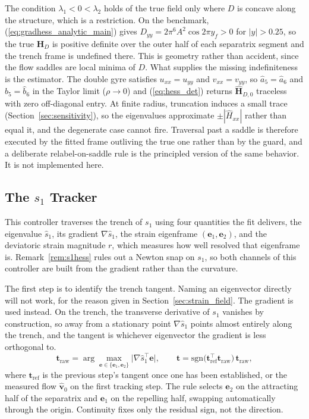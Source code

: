 \documentclass[lettersize,journal]{IEEEtran}
\begin{document}
The condition $\lambda_1 < 0 < \lambda_2$ holds of the true field only
where $D$ is concave along the structure, which is a restriction. On the
benchmark, (\ref{eq:gradhess_analytic_main}) gives $D_{yy} = 2\pi^6
A^2\cos 2\pi y_f > 0$ for $|y| > 0.25$, so the true $\mathbf{H}_D$ is
positive definite over the outer half of each separatrix segment and the
trench frame is undefined there. This is geometry rather than accident,
since the flow saddles are local minima of $D$. What supplies the
missing indefiniteness is the estimator. The double gyre satisfies
$u_{xx} = u_{yy}$ and $v_{xx} = v_{yy}$, so $\hat{a}_5 = \hat{a}_6$ and
$\hat{b}_5 = \hat{b}_6$ in the Taylor limit ($\rho \to 0$) and
(\ref{eq:hess_det}) returns $\hat{\mathbf{H}}_{D,0}$ traceless with zero
off-diagonal entry. At finite radius, truncation induces a small trace
(Section~\ref{sec:sensitivity}), so the eigenvalues approximate
$\pm|\hat{H}_{xx}|$ rather than equal it, and the degenerate
case cannot fire. Traversal past a saddle is therefore executed by the
fitted frame outliving the true one rather than by the guard, and a
deliberate relabel-on-saddle rule is the principled version of the same
behavior. It is not implemented here.




\subsection{The $s_1$ Tracker}


This controller traverses the trench of $s_1$ using four quantities the
fit delivers, the eigenvalue $\hat{s}_1$, its gradient
$\nabla\hat{s}_1$, the strain eigenframe $(\mathbf{e}_1, \mathbf{e}_2)$,
and the deviatoric strain magnitude $r$, which measures how well resolved
that eigenframe is. Remark~\ref{rem:s1hess} rules out a Newton snap on
$s_1$, so both
channels of this controller are built from the gradient rather than the
curvature.

The first step is to identify the trench tangent. Naming an eigenvector
directly will not work, for the reason given in
Section~\ref{sec:strain_field}. The gradient is used instead. On the
trench, the transverse derivative of $s_1$ vanishes by construction, so
away from a stationary point $\nabla\hat{s}_1$ points almost entirely
along the trench, and the tangent is whichever eigenvector the gradient
is less orthogonal to.
\begin{equation}
    \mathbf{t}_{\mathrm{raw}} =
    \arg\max_{\mathbf{e} \in \{\mathbf{e}_1, \mathbf{e}_2\}}
    \bigl\lvert \nabla\hat{s}_1^\top \mathbf{e} \bigr\rvert,
    \qquad
    \mathbf{t} = \mathrm{sgn}\bigl(\mathbf{t}_{\mathrm{ref}}^\top
    \mathbf{t}_{\mathrm{raw}}\bigr)\,\mathbf{t}_{\mathrm{raw}},
    \label{eq:tangent_select}
\end{equation}
where $\mathbf{t}_{\mathrm{ref}}$ is the previous step's tangent once one
has been established, or the measured flow $\hat{\mathbf{v}}_0$ on the
first tracking step. The rule selects $\mathbf{e}_2$ on the attracting
half of the separatrix and $\mathbf{e}_1$ on the repelling half, swapping
automatically through the origin. Continuity fixes only the residual
sign, not the direction.
\end{document}
